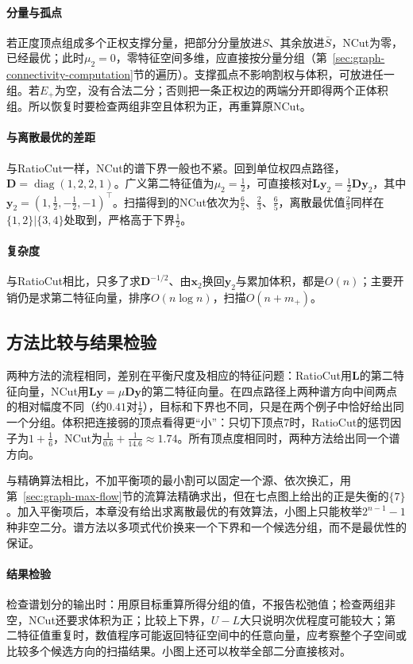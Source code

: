 \paragraph{分量与孤点}
若正度顶点组成多个正权支撑分量，把部分分量放进$S$、其余放进$\bar S$，NCut为零，已经最优；此时$\mu_2=0$，零特征空间多维，应直接按分量分组（第~\ref{sec:graph-connectivity-computation}节的遍历）。支撑孤点不影响割权与体积，可放进任一组。若$E_+$为空，没有合法二分；否则把一条正权边的两端分开即得两个正体积组。所以恢复时要检查两组非空且体积为正，再重算原NCut。

\paragraph{与离散最优的差距}
与RatioCut一样，NCut的谱下界一般也不紧。回到单位权四点路径，$\bm D=\operatorname{diag}(1,2,2,1)$。广义第二特征值为$\mu_2=\tfrac12$，可直接核对$\bm L\bm y_2=\tfrac12\bm D\bm y_2$，其中$\bm y_2=(1,\tfrac12,-\tfrac12,-1)^{\top}$。扫描得到的NCut依次为$\tfrac65$、$\tfrac23$、$\tfrac65$，离散最优值$\tfrac23$同样在$\{1,2\}|\{3,4\}$处取到，严格高于下界$\tfrac12$。

\paragraph{复杂度}
与RatioCut相比，只多了求$\bm D^{-1/2}$、由$\bm x_2$换回$\bm y_2$与累加体积，都是$O(n)$；主要开销仍是求第二特征向量，排序$O(n\log n)$，扫描$O(n+m_+)$。

\subsection{方法比较与结果检验}
\label{sec:graph-spec-partition-comparison}

两种方法的流程相同，差别在平衡尺度及相应的特征问题：RatioCut用$\bm L$的第二特征向量，NCut用$\bm L\bm y=\mu\bm D\bm y$的第二特征向量。在四点路径上两种谱方向中间两点的相对幅度不同（约$0.41$对$\tfrac12$），目标和下界也不同，只是在两个例子中恰好给出同一个分组。体积把连接弱的顶点看得更“小”：只切下顶点$7$时，RatioCut的惩罚因子为$1+\tfrac16$，NCut为$\tfrac1{0.6}+\tfrac1{14.6}\approx1.74$。所有顶点度相同时，两种方法给出同一个谱方向。

与精确算法相比，不加平衡项的最小割可以固定一个源、依次换汇，用第~\ref{sec:graph-max-flow}节的流算法精确求出，但在七点图上给出的正是失衡的$\{7\}$。加入平衡项后，本章没有给出求离散最优的有效算法，小图上只能枚举$2^{n-1}-1$种非空二分。谱方法以多项式代价换来一个下界和一个候选分组，而不是最优性的保证。

\paragraph{结果检验}
检查谱划分的输出时：用原目标重算所得分组的值，不报告松弛值；检查两组非空，NCut还要求体积为正；比较上下界，$U-L$大只说明次优程度可能较大；第二特征值重复时，数值程序可能返回特征空间中的任意向量，应考察整个子空间或比较多个候选方向的扫描结果。小图上还可以枚举全部二分直接核对。
